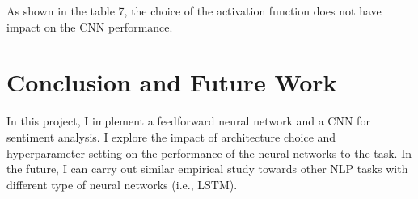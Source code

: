 \documentclass[11pt,a4paper]{article}
\begin{document}
As shown in the table 7, the choice of the activation function does not have impact on the 
CNN performance.

\section{Conclusion and Future Work}

In this project, I implement a feedforward neural network and a CNN for sentiment analysis.
I explore the impact of architecture choice and hyperparameter setting on the performance of 
the neural networks to the task. In the future, I can carry out similar empirical study towards
other NLP tasks with different type of neural networks (i.e., LSTM).



\end{document}
